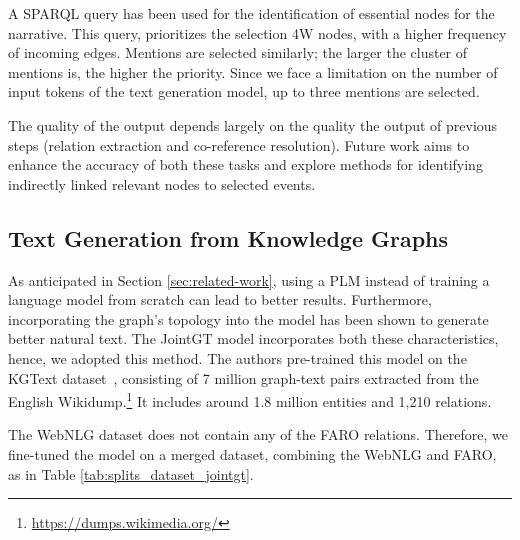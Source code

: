 \documentclass[
hf, %
]{ceurart}
\begin{document}

A SPARQL query has been used for the identification of essential nodes for the narrative. This query, prioritizes the selection 4W nodes, with a higher frequency of incoming edges. Mentions are selected similarly; the larger the cluster of mentions is, the higher the priority. Since we face a limitation on the number of input tokens of the text generation model, up to three mentions are selected.

The quality of the output depends largely on the quality the output of previous steps (relation extraction and co-reference resolution). Future work aims to enhance the accuracy of both these tasks and explore methods for identifying indirectly linked relevant nodes to selected events.


\subsection{Text Generation from Knowledge Graphs}
As anticipated in Section \ref{sec:related-work}, using a PLM instead of training a language model from scratch can lead to better results. Furthermore, incorporating the graph's topology into the model has been shown to generate better natural text. The JointGT model \cite{JointGT} incorporates both these characteristics, hence, we adopted this method. The authors pre-trained this model on the KGText dataset~\cite{KGtext}, consisting of 7 million graph-text pairs extracted from the English Wikidump.\footnote{\url{https://dumps.wikimedia.org/}} It includes around 1.8 million entities and 1,210 relations.

The WebNLG dataset does not contain any of the FARO relations. Therefore, we fine-tuned the model on a merged dataset, combining the WebNLG and FARO, as in Table \ref{tab:splits_dataset_jointgt}.
\end{document}
